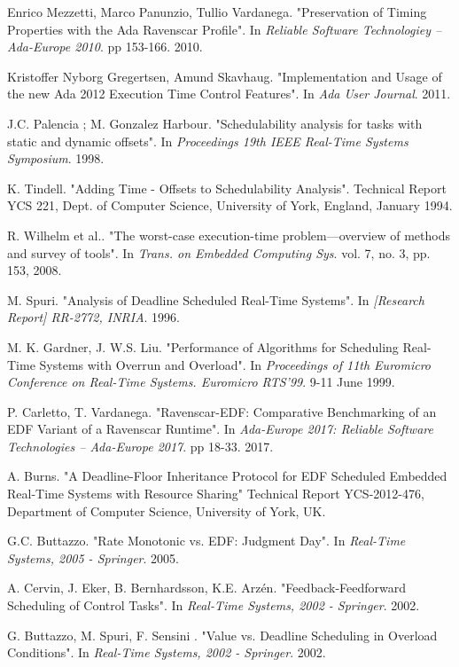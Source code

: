 \documentclass{article}
\begin{document}
\begin{thebibliography}{1}
Enrico Mezzetti, Marco Panunzio, Tullio Vardanega.
\newblock "Preservation of Timing Properties with the Ada Ravenscar Profile".
\newblock In {\em Reliable Software Technologiey – Ada-Europe 2010}. pp 153-166. 2010.

Kristoffer Nyborg Gregertsen, Amund Skavhaug.
\newblock "Implementation and Usage of the new Ada 2012 Execution Time Control Features".
\newblock In {\em Ada User Journal}. 2011.

J.C. Palencia ; M. Gonzalez Harbour.
\newblock "Schedulability analysis for tasks with static and dynamic offsets".
\newblock In {\em Proceedings 19th IEEE Real-Time Systems Symposium}. 1998.

K. Tindell.
\newblock "Adding Time - Offsets to Schedulability Analysis".
\newblock Technical Report YCS 221, Dept. of Computer Science, University of York, England, January 1994.

R. Wilhelm et al..
\newblock "The worst-case execution-time problem—overview of methods and survey of tools".
\newblock In {\em Trans. on Embedded Computing Sys}. vol. 7, no. 3, pp. 153, 2008.

M. Spuri.
\newblock "Analysis of Deadline Scheduled Real-Time Systems".
\newblock In {\em [Research Report] RR-2772, INRIA}. 1996.

M. K. Gardner, J. W.S. Liu.
\newblock "Performance of Algorithms for Scheduling Real-Time Systems with Overrun and Overload".
\newblock In {\em Proceedings of 11th Euromicro Conference on Real-Time Systems. Euromicro RTS'99}. 9-11 June 1999.

P. Carletto, T. Vardanega.
\newblock "Ravenscar-EDF: Comparative Benchmarking of an EDF Variant of a Ravenscar Runtime".
\newblock In {\em Ada-Europe 2017: Reliable Software Technologies – Ada-Europe 2017}. pp 18-33. 2017.

A. Burns.
\newblock "A Deadline-Floor Inheritance Protocol for EDF Scheduled Embedded Real-Time Systems with Resource Sharing"
\newblock Technical Report YCS-2012-476, Department of Computer Science, University of York, UK.

G.C. Buttazzo.
\newblock "Rate Monotonic vs. EDF: Judgment Day".
\newblock In {\em Real-Time Systems, 2005 - Springer}. 2005.

A. Cervin, J. Eker, B. Bernhardsson, K.E. Arzén.
\newblock "Feedback-Feedforward Scheduling of Control Tasks".
\newblock In {\em Real-Time Systems, 2002 - Springer}. 2002.

G. Buttazzo, M. Spuri, F. Sensini .
\newblock "Value vs. Deadline Scheduling in Overload Conditions".
\newblock In {\em Real-Time Systems, 2002 - Springer}. 2002.

\end{thebibliography}
\end{document}
